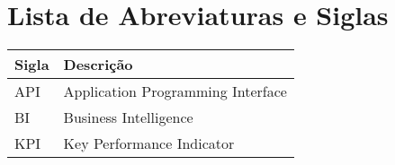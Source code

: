 \chapter*{Lista de Abreviaturas e Siglas}
\begin{longtable}{p{3cm} p{10cm}}
	\textbf{Sigla} & \textbf{Descrição} \\
	\hline
	API & Application Programming Interface \\
	BI & Business Intelligence \\
	KPI & Key Performance Indicator \\
\end{longtable}
